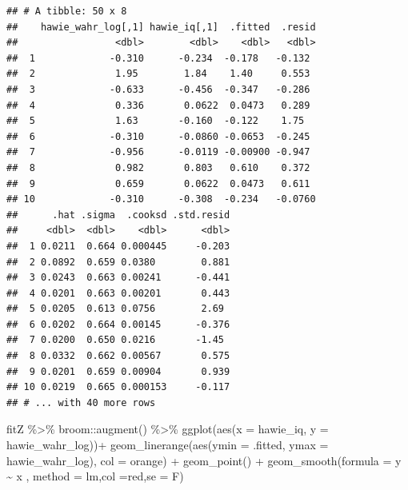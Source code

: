 \documentclass[
]{book}
\newenvironment{Shaded}{\begin{snugshade}}{\end{snugshade}}
\newcommand{\AttributeTok}[1]{\textcolor[rgb]{0.77,0.63,0.00}{#1}}
\newcommand{\FunctionTok}[1]{\textcolor[rgb]{0.00,0.00,0.00}{#1}}
\newcommand{\NormalTok}[1]{#1}
\newcommand{\SpecialCharTok}[1]{\textcolor[rgb]{0.00,0.00,0.00}{#1}}
\newcommand{\StringTok}[1]{\textcolor[rgb]{0.31,0.60,0.02}{#1}}
\begin{document}
\begin{verbatim}
## # A tibble: 50 x 8
##    hawie_wahr_log[,1] hawie_iq[,1]  .fitted  .resid
##                 <dbl>        <dbl>    <dbl>   <dbl>
##  1             -0.310      -0.234  -0.178   -0.132 
##  2              1.95        1.84    1.40     0.553 
##  3             -0.633      -0.456  -0.347   -0.286 
##  4              0.336       0.0622  0.0473   0.289 
##  5              1.63       -0.160  -0.122    1.75  
##  6             -0.310      -0.0860 -0.0653  -0.245 
##  7             -0.956      -0.0119 -0.00900 -0.947 
##  8              0.982       0.803   0.610    0.372 
##  9              0.659       0.0622  0.0473   0.611 
## 10             -0.310      -0.308  -0.234   -0.0760
##      .hat .sigma  .cooksd .std.resid
##     <dbl>  <dbl>    <dbl>      <dbl>
##  1 0.0211  0.664 0.000445     -0.203
##  2 0.0892  0.659 0.0380        0.881
##  3 0.0243  0.663 0.00241      -0.441
##  4 0.0201  0.663 0.00201       0.443
##  5 0.0205  0.613 0.0756        2.69 
##  6 0.0202  0.664 0.00145      -0.376
##  7 0.0200  0.650 0.0216       -1.45 
##  8 0.0332  0.662 0.00567       0.575
##  9 0.0201  0.659 0.00904       0.939
## 10 0.0219  0.665 0.000153     -0.117
## # ... with 40 more rows
\end{verbatim}

\begin{Shaded}
\begin{Highlighting}[]
\NormalTok{fitZ }\SpecialCharTok{\%\textgreater{}\%} 
\NormalTok{  broom}\SpecialCharTok{::}\FunctionTok{augment}\NormalTok{() }\SpecialCharTok{\%\textgreater{}\%} 
  \FunctionTok{ggplot}\NormalTok{(}\FunctionTok{aes}\NormalTok{(}\AttributeTok{x =}\NormalTok{ hawie\_iq, }
             \AttributeTok{y =}\NormalTok{ hawie\_wahr\_log))}\SpecialCharTok{+}
  \FunctionTok{geom\_linerange}\NormalTok{(}\FunctionTok{aes}\NormalTok{(}\AttributeTok{ymin =}\NormalTok{ .fitted, }\AttributeTok{ymax =}\NormalTok{ hawie\_wahr\_log), }\AttributeTok{col =} \StringTok{\textquotesingle{}orange\textquotesingle{}}\NormalTok{) }\SpecialCharTok{+}
    \FunctionTok{geom\_point}\NormalTok{() }\SpecialCharTok{+}
    \FunctionTok{geom\_smooth}\NormalTok{(}\AttributeTok{formula =}\NormalTok{  y }\SpecialCharTok{\textasciitilde{}}\NormalTok{ x ,}
                \AttributeTok{method =} \StringTok{\textquotesingle{}lm\textquotesingle{}}\NormalTok{,}\AttributeTok{col =}\StringTok{\textquotesingle{}red\textquotesingle{}}\NormalTok{,}\AttributeTok{se =}\NormalTok{ F)}
\end{Highlighting}
\end{Shaded}
\end{document}
